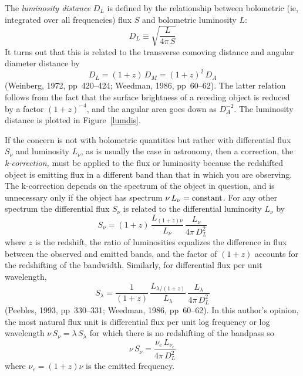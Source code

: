 The {\em luminosity distance\/} $D_L$ is defined by the relationship
between bolometric (ie, integrated over all frequencies) flux $S$
and bolometric luminosity $L$:
\begin{equation}
D_L\equiv \sqrt{\frac{L}{4\pi\,S}}
\end{equation}
It turns out that this is related to the transverse comoving distance
and angular diameter distance by
\begin{equation}
D_L = (1+z)\,D_M = (1+z)^2\,D_A
\end{equation}
(Weinberg, 1972, pp~420--424; Weedman, 1986, pp~60--62).  The latter
relation follows from the fact that the surface brightness of a
receding object is reduced by a factor $(1+z)^{-4}$, and the angular
area goes down as $D_A^{-2}$.  The luminosity distance is plotted in
Figure~\ref{lumdis}.

If the concern is not with bolometric quantities but rather with
differential flux $S_{\nu}$ and luminosity $L_{\nu}$, as is usually
the case in astronomy, then a correction, the {\em k-correction,\/}
must be applied to the flux or luminosity because the redshifted
object is emitting flux in a different band than that in which you are
observing.  The k-correction depends on the spectrum of the object in
question, and is unnecessary only if the object has spectrum
$\nu\,L_{\nu}={\rm constant}$.  For any other spectrum the
differential flux $S_{\nu}$ is related to the differential luminosity
$L_{\nu}$ by
\begin{equation}
S_{\nu} = (1+z)\,\frac{L_{(1+z)\nu}}{L_{\nu}}\,\frac{L_{\nu}}{4\pi\,D_L^2}
\end{equation}
where $z$ is the redshift, the ratio of luminosities equalizes the
difference in flux between the observed and emitted bands, and the
factor of $(1+z)$ accounts for the redshifting of the bandwidth.
Similarly, for differential flux per unit wavelength,
\begin{equation}
S_{\lambda} = \frac{1}{(1+z)}\,\frac{L_{\lambda/(1+z)}}{L_{\lambda}}\,
\frac{L_{\lambda}}{4\pi\,D_L^2}
\end{equation}
(Peebles, 1993, pp~330--331; Weedman, 1986, pp~60--62).  In this
author's opinion, the most natural flux unit is differential flux per
unit log frequency or log wavelength
$\nu\,S_{\nu}=\lambda\,S_{\lambda}$ for which there is no redshifting
of the bandpass so
\begin{equation}
\nu\,S_{\nu} = \frac{\nu_e\,L_{\nu_e}}{4\pi\,D_L^2}
\end{equation}
where $\nu_e=(1+z)\nu$ is the emitted frequency.

